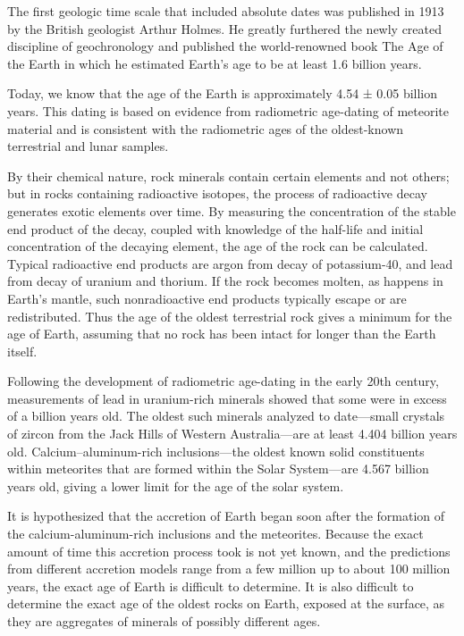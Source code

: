 \documentclass[]{book}
\theoremstyle{definition}
\theoremstyle{definition}
\theoremstyle{definition}
\theoremstyle{remark}
\begin{document}
\begin{enumerate}
The first geologic time scale that included absolute dates was published
in 1913 by the British geologist Arthur Holmes. He greatly furthered the
newly created discipline of geochronology and published the
world-renowned book The Age of the Earth in which he estimated Earth's
age to be at least 1.6 billion years.

Today, we know that the age of the Earth is approximately 4.54 ± 0.05
billion years. This dating is based on evidence from radiometric
age-dating of meteorite material and is consistent with the radiometric
ages of the oldest-known terrestrial and lunar samples.

By their chemical nature, rock minerals contain certain elements and not
others; but in rocks containing radioactive isotopes, the process of
radioactive decay generates exotic elements over time. By measuring the
concentration of the stable end product of the decay, coupled with
knowledge of the half-life and initial concentration of the decaying
element, the age of the rock can be calculated. Typical radioactive end
products are argon from decay of potassium-40, and lead from decay of
uranium and thorium. If the rock becomes molten, as happens in Earth's
mantle, such nonradioactive end products typically escape or are
redistributed. Thus the age of the oldest terrestrial rock gives a
minimum for the age of Earth, assuming that no rock has been intact for
longer than the Earth itself.

Following the development of radiometric age-dating in the early 20th
century, measurements of lead in uranium-rich minerals showed that some
were in excess of a billion years old. The oldest such minerals analyzed
to date---small crystals of zircon from the Jack Hills of Western
Australia---are at least 4.404 billion years old. Calcium--aluminum-rich
inclusions---the oldest known solid constituents within meteorites that
are formed within the Solar System---are 4.567 billion years old, giving
a lower limit for the age of the solar system.

It is hypothesized that the accretion of Earth began soon after the
formation of the calcium-aluminum-rich inclusions and the meteorites.
Because the exact amount of time this accretion process took is not yet
known, and the predictions from different accretion models range from a
few million up to about 100 million years, the exact age of Earth is
difficult to determine. It is also difficult to determine the exact age
of the oldest rocks on Earth, exposed at the surface, as they are
aggregates of minerals of possibly different ages.


\end{enumerate}
\end{document}
